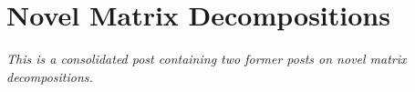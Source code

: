 \section{Novel Matrix Decompositions}

\emph{This is a consolidated post containing two former posts on novel matrix decompositions.}



